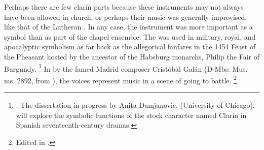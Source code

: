 %
%

Perhaps there are few clarín parts because these instruments may not always have been allowed in church, or perhaps their music was generally improvised, like that of the Lutheran .
In any case, the instrument was more important as a symbol than as part of the chapel ensemble.
The  was used in military, royal, and apocalyptic symbolism as far back as the allegorical  fanfares in the 1454 Feast of the Pheasant hosted by the ancestor of the Habsburg monarchs, Philip the Fair of Burgundy.%
	\footnote{%
	\autocites[340--380]{LaMarche:Memoires}{Bloxam:JNV}{Perkins:Patronage15C}.
The dissertation in progress by Anita Damjanovic,  (University of Chicago), will explore the symbolic functions of the stock character named Clarín in Spanish seventeenth-century dramas.
	}
In  by the famed Madrid composer Cristóbal Galán (D-Mbs: Mus. ms. 2892, from ), the voices represent  music in a scene of  going to battle.%
	\footnote{%
	Edited in \autocite[555--565]{CaberoPueyo:PhD}.
	}

